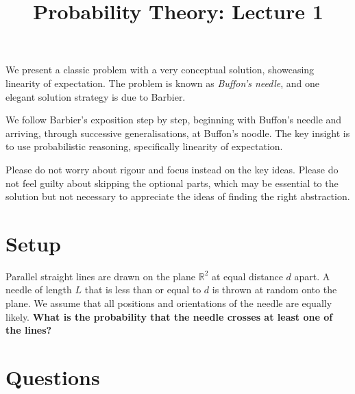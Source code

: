 \documentclass[12pt]{article}
\title{Probability Theory: Lecture 1}
\author{}
\date{}
\begin{document}
\maketitle

We present a classic problem with a very conceptual 
solution, showcasing linearity of expectation. 
The problem is known as \emph{Buffon's 
needle}, and one elegant solution strategy is due to 
Barbier.

We follow Barbier's exposition step by step, beginning with Buffon's needle and arriving, through successive generalisations, at Buffon's noodle. The key
insight is to use probabilistic reasoning, specifically linearity of
expectation.

Please do not worry about rigour and focus instead on the key ideas. Please do not feel guilty about skipping the optional parts, which may be essential to the solution but not necessary to appreciate the ideas of finding the right abstraction.

\section*{Setup}

Parallel straight lines are drawn on the plane $\mathbb{R}^2$ at equal
distance $d$ apart. A needle of length $L$ that is less than or equal to $d$ is thrown at random onto the
plane. We assume that all positions and orientations of the needle are
equally likely. \textbf{What is the probability that the needle crosses at
least one of the lines?}

\section*{Questions}
\end{document}
